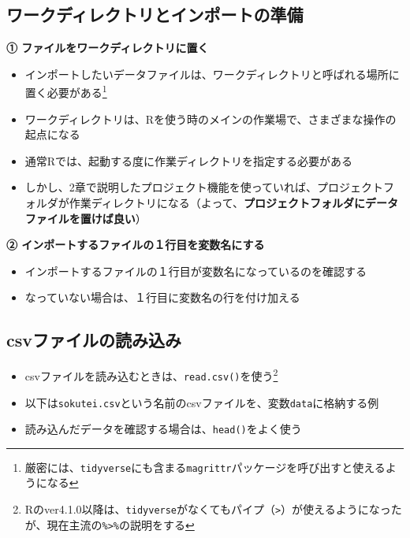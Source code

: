 \documentclass[
]{book}
\providecommand{\tightlist}{%
  \setlength{\itemsep}{0pt}\setlength{\parskip}{0pt}}
\begin{document}
\hypertarget{ux30efux30fcux30afux30c7ux30a3ux30ecux30afux30c8ux30eaux3068ux30a4ux30f3ux30ddux30fcux30c8ux306eux6e96ux5099}{%
\subsection{ワークディレクトリとインポートの準備}\label{ux30efux30fcux30afux30c7ux30a3ux30ecux30afux30c8ux30eaux3068ux30a4ux30f3ux30ddux30fcux30c8ux306eux6e96ux5099}}

\textbf{① ファイルをワークディレクトリに置く}

\begin{itemize}
\tightlist
\item
  インポートしたいデータファイルは、ワークディレクトリと呼ばれる場所に置く必要がある\footnote{厳密には、\texttt{tidyverse}にも含まる\texttt{magrittr}パッケージを呼び出すと使えるようになる}
\item
  ワークディレクトリは、Rを使う時のメインの作業場で、さまざまな操作の起点になる
\item
  通常Rでは、起動する度に作業ディレクトリを指定する必要がある
\item
  しかし、2章で説明したプロジェクト機能を使っていれば、プロジェクトフォルダが作業ディレクトリになる（よって、\textbf{プロジェクトフォルダにデータファイルを置けば良い}）
\end{itemize}

\textbf{② インポートするファイルの１行目を変数名にする}

\begin{itemize}
\tightlist
\item
  インポートするファイルの１行目が変数名になっているのを確認する
\item
  なっていない場合は、１行目に変数名の行を付け加える
\end{itemize}

\hypertarget{csvux30d5ux30a1ux30a4ux30ebux306eux8aadux307fux8fbcux307f}{%
\subsection{csvファイルの読み込み}\label{csvux30d5ux30a1ux30a4ux30ebux306eux8aadux307fux8fbcux307f}}

\begin{itemize}
\tightlist
\item
  csvファイルを読み込むときは、\texttt{read.csv()}を使う\footnote{Rのver4.1.0以降は、\texttt{tidyverse}がなくてもパイプ（\texttt{\textbar{}\textgreater{}}）が使えるようになったが、現在主流の\texttt{\%\textgreater{}\%}の説明をする}
\item
  以下は\texttt{sokutei.csv}という名前のcsvファイルを、変数\texttt{data}に格納する例
\item
  読み込んだデータを確認する場合は、\texttt{head()}をよく使う
\end{itemize}
\end{document}
